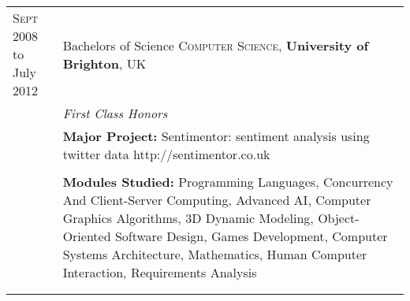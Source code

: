 \documentclass[a4paper,10pt]{article} %
\begin{document}
\begin{tabular}{ L{2cm} | L{11cm}}	
\textsc{Sept} 2008 to July 2012  & Bachelors of Science \textsc{Computer Science}, \textbf{University of Brighton}, UK\\
& \small\emph{First Class Honors} \\
& \small\textbf{Major Project:} Sentimentor: sentiment analysis using twitter data http://sentimentor.co.uk \\
&\normalsize \\
& \small\textbf{Modules Studied:} Programming Languages, Concurrency And Client-Server Computing, Advanced AI, Computer Graphics Algorithms, 3D Dynamic Modeling, Object-Oriented Software Design, Games Development, Computer Systems Architecture, Mathematics, Human Computer Interaction, Requirements Analysis  \\
&\\

 \\




%
%
%
%

\end{tabular}
\end{document}
